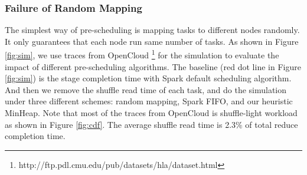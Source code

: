 



\subsubsection{Failure of Random Mapping}\label{randomassign}
The simplest way of pre-scheduling is mapping tasks to different nodes randomly. It only guarantees that each node run same number of tasks. 
As shown in Figure \ref{fig:sim}, we use traces from OpenCloud \footnote{\label{fn:trace}http://ftp.pdl.cmu.edu/pub/datasets/hla/dataset.html} for the simulation to evaluate the impact of different pre-scheduling algorithms. The baseline (red dot line in Figure \ref{fig:sim}) is the stage completion time with Spark default scheduling algorithm. And then we remove the shuffle read time of each task, and do the simulation under three different schemes: random mapping, Spark FIFO, and our heuristic MinHeap.
Note that most of the traces from OpenCloud is shuffle-light workload as shown in Figure \ref{fig:cdf}. The average shuffle read time is 2.3\% of total reduce completion time.

